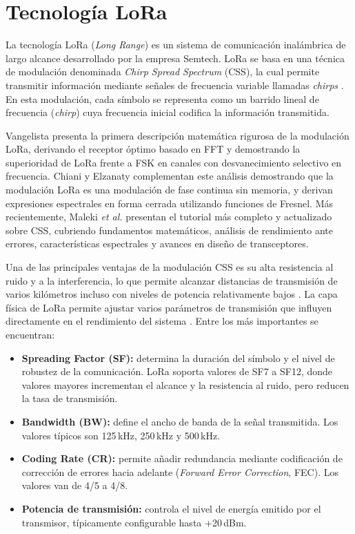 \section{Tecnología LoRa}
\label{sec:lora}

La tecnología LoRa (\textit{Long Range}) es un sistema de comunicación inalámbrica de largo alcance desarrollado por la empresa Semtech. LoRa se basa en una técnica de modulación denominada \textit{Chirp Spread Spectrum} (CSS), la cual permite transmitir información mediante señales de frecuencia variable llamadas \textit{chirps} \cite{vangelista2017frequency}. En esta modulación, cada símbolo se representa como un barrido lineal de frecuencia (\textit{chirp}) cuya frecuencia inicial codifica la información transmitida.

Vangelista \cite{vangelista2017frequency} presenta la primera descripción matemática rigurosa de la modulación LoRa, derivando el receptor óptimo basado en FFT y demostrando la superioridad de LoRa frente a FSK en canales con desvanecimiento selectivo en frecuencia. Chiani y Elzanaty \cite{chiani2019lora} complementan este análisis demostrando que la modulación LoRa es una modulación de fase continua sin memoria, y derivan expresiones espectrales en forma cerrada utilizando funciones de Fresnel. Más recientemente, Maleki \textit{et al.} \cite{maleki2024tutorial} presentan el tutorial más completo y actualizado sobre CSS, cubriendo fundamentos matemáticos, análisis de rendimiento ante errores, características espectrales y avances en diseño de transceptores.

Una de las principales ventajas de la modulación CSS es su alta resistencia al ruido y a la interferencia, lo que permite alcanzar distancias de transmisión de varios kilómetros incluso con niveles de potencia relativamente bajos \cite{augustin2016study}. La capa física de LoRa permite ajustar varios parámetros de transmisión que influyen directamente en el rendimiento del sistema \cite{haxhibeqiri2018survey, pasolini2022chirp}. Entre los más importantes se encuentran:

\begin{itemize}
    \item \textbf{Spreading Factor (SF):} determina la duración del símbolo y el nivel de robustez de la comunicación. LoRa soporta valores de SF7 a SF12, donde valores mayores incrementan el alcance y la resistencia al ruido, pero reducen la tasa de transmisión.
    \item \textbf{Bandwidth (BW):} define el ancho de banda de la señal transmitida. Los valores típicos son 125\,kHz, 250\,kHz y 500\,kHz.
    \item \textbf{Coding Rate (CR):} permite añadir redundancia mediante codificación de corrección de errores hacia adelante (\textit{Forward Error Correction}, FEC). Los valores van de 4/5 a 4/8.
    \item \textbf{Potencia de transmisión:} controla el nivel de energía emitido por el transmisor, típicamente configurable hasta +20\,dBm.
\end{itemize}

